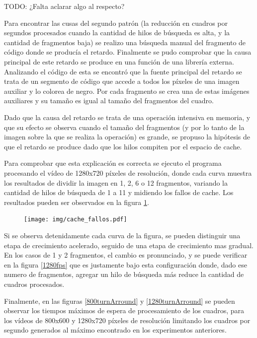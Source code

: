 TODO: ¿Falta aclarar algo al respecto?

Para encontrar las cusas del segundo patrón (la reducción en cuadros por
segundos procesados cuando la cantidad de hilos de búsqueda es alta, y la
cantidad de fragmentos baja) se realizo una búsqueda manual del fragmento de
código donde se producía el retardo. Finalmente se pudo comprobar que la causa
principal de este retardo se produce en una función de una librería externa.
Analizando el código de esta se encontró que la fuente principal del retardo se
trata de un segmento de código que accede a todos los píxeles de una imagen
auxiliar y lo colorea de negro. Por cada fragmento se crea una de estas imágenes
auxiliares y su tamaño es igual al tamaño del fragmentos del cuadro.

Dado que la causa del retardo se trata de una operación intensiva en memoria, y
que su efecto se observa cuando el tamaño del fragmentos (y por lo tanto de la
imagen sobre la que se realiza la operación) es grande, se propuso la hipótesis
de que el retardo se produce dado que los hilos compiten por el espacio de
cache.

Para comprobar que esta explicación es correcta se ejecuto el programa
procesando el vídeo de 1280x720 píxeles de resolución, donde cada curva muestra
los resultados de dividir la imagen en 1, 2, 6 o 12 fragmentos, variando la
cantidad de hilos de búsqueda de 1 a 11 y midiendo los fallos de cache. Los
resultados pueden ser observados en la figura \ref{cacheFallos}.

\begin{figure}[!h]

	\texttt{[image: img/cache\_fallos.pdf]}
	\caption{}
	\label{cacheFallos}

\end{figure}

Si se observa detenidamente cada curva de la figura, se pueden distinguir una
etapa de crecimiento acelerado, seguido de una etapa de crecimiento mas gradual.
En los casos de 1 y 2 fragmentos, el cambio es pronunciado, y se puede verificar
en la figura \ref{1280fps} que es justamente bajo esta configuración donde, dado
ese numero de fragmentos, agregar un hilo de búsqueda más reduce la cantidad de
cuadros procesados.

Finalmente, en las figuras \ref{800turnArround} y \ref{1280turnArround} se
pueden observar los tiempos máximos de espera de procesamiento de los cuadros,
para los vídeos de 800x600 y 1280x720 píxeles de resolución limitando los
cuadros por segundo generados al máximo encontrado en los experimentos
anteriores.

